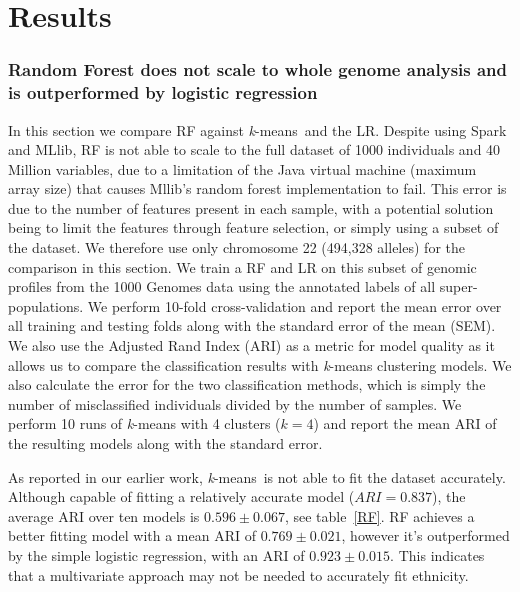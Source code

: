 \documentclass{llncs}
\newcommand{\kMeans}{\textit{k}-means}
\begin{document}
{\section{Results}

\subsubsection{Random Forest does not scale to whole genome analysis and is outperformed by logistic regression}
In this section we compare RF against \kMeans\ and the LR.  
Despite using {\sc Spark} and {\sc MLlib}, RF is not able to scale to the full dataset of 1000 individuals and 40
Million variables, due to a limitation of the Java virtual machine (maximum array size) that causes {\sc Mllib}'s
random forest implementation to fail. This error is due to the number of features present in each sample,
with a potential solution being to limit the features through feature selection, or simply using a subset of the dataset.
We therefore use only chromosome 22 (494,328 alleles) for the comparison in this section.  We train a RF
and LR on this subset of genomic profiles from the 1000 Genomes data using the annotated labels of all
super-populations.  We perform 10-fold cross-validation and report the mean error over all training and testing folds
along with the standard error of the mean (SEM). We also use the Adjusted Rand Index (ARI) as a metric for model quality
as it allows us to compare the classification results with \kMeans{} clustering models. We also calculate the error
for the two classification methods, which is simply the number of misclassified individuals divided by the number of samples.
We perform 10 runs of \kMeans{} with 4 clusters (\(k=4\)) and report the mean ARI of the
resulting models along with the standard error.

As reported in our earlier work, \kMeans\ is not able to fit the dataset accurately.
Although capable of fitting a relatively accurate model (\(ARI=0.837\)), the average ARI over ten models is  \(0.596 \pm 0.067\), see table~\ref{RF}.
RF achieves a better fitting model with a mean ARI of \(0.769 \pm 0.021\), however it's outperformed by the simple logistic regression, with an ARI of \(0.923 \pm 0.015\).
This indicates that a multivariate approach may not be needed to accurately fit ethnicity. 


}
\end{document}
